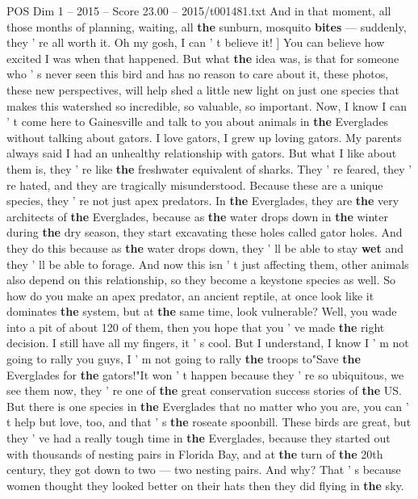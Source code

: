 \begin{textsample}{POS Dim 1 – 2015 – Score 23.00 – 2015/t001481.txt}
And in that moment, all those months of planning, waiting, all \textbf{the} sunburn, mosquito \textbf{bites} — suddenly, they ' re all worth it.
Oh my gosh, I can ' t believe it! ] You can believe how excited I was when that happened.
But what \textbf{the} idea was, is that for someone who ' s never seen this bird and has no reason to care about it, these photos, these new perspectives, will help shed a little new light on just one species that makes this watershed so incredible, so valuable, so important.
Now, I know I can ' t come here to Gainesville and talk to you about animals in \textbf{the} Everglades without talking about gators.
I love gators, I grew up loving gators.
My parents always said I had an unhealthy relationship with gators.
But what I like about them is, they ' re like \textbf{the} freshwater equivalent of sharks.
They ' re feared, they ' re hated, and they are tragically misunderstood.
Because these are a unique species, they ' re not just apex predators.
In \textbf{the} Everglades, they are \textbf{the} very architects of \textbf{the} Everglades, because as \textbf{the} water drops down in \textbf{the} winter during \textbf{the} dry season, they start excavating these holes called gator holes.
And they do this because as \textbf{the} water drops down, they ' ll be able to stay \textbf{wet} and they ' ll be able to forage.
And now this isn ' t just affecting them, other animals also depend on this relationship, so they become a keystone species as well.
So how do you make an apex predator, an ancient reptile, at once look like it dominates \textbf{the} system, but at \textbf{the} same time, look vulnerable?
Well, you wade into a pit of about 120 of them, then you hope that you ' ve made \textbf{the} right decision.
I still have all my fingers, it ' s cool.
But I understand, I know I ' m not going to rally you guys, I ' m not going to rally \textbf{the} troops to"Save \textbf{the} Everglades for \textbf{the} gators!"It won ' t happen because they ' re so ubiquitous, we see them now, they ' re one of \textbf{the} great conservation success stories of \textbf{the} US.
But there is one species in \textbf{the} Everglades that no matter who you are, you can ' t help but love, too, and that ' s \textbf{the} roseate spoonbill.
These birds are great, but they ' ve had a really tough time in \textbf{the} Everglades, because they started out with thousands of nesting pairs in Florida Bay, and at \textbf{the} turn of \textbf{the} 20th century, they got down to two — two nesting pairs.
And why?
That ' s because women thought they looked better on their hats then they did flying in \textbf{the} sky.

\end{textsample}
